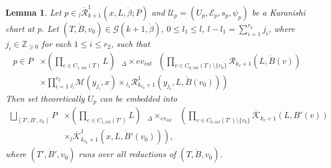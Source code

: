 \documentclass[a4paper]{article}
\newtheorem{lemma}[theorem]{Lemma}
\numberwithin{equation}{section}
\begin{document}
\begin{lemma}\label{lemma:chart}
Let $p\in{}_l\overline{\mathcal{R}}_{k+1}^1(x,L,\ring{\beta};P)$ and $\mathcal{U}_p=(U_p,\mathcal{E}_p,s_p,\psi_p)$ be a Kuranishi chart at $p$. Let $(T,\ring{B},v_0)\in\mathcal{G}(k+1,\ring{\beta})$, $0\leq l_1\leq l$, $l-l_1=\sum_{i=1}^{r_2}j_i$, where $j_i\in\mathbb{Z}_{\geq0}$ for each $1\leq i\leq r_2$, such that
\begin{equation}\label{eq:stratum}
\begin{split}
p\in P&\times\left(\prod_{e\in C_{1,\mathit{int}}(T)}L\right)\textrm{ }{{}_\Delta\times\mathit{ev}_\mathit{int}}\textrm{ }\left(\prod_{v\in C_{0,\mathit{int}}(T)\setminus\{v_0\}}\mathcal{R}_{k_v+1}\left(L,\ring{B}(v)\right)\right. \\
&\left.\times\prod_{i=1}^{r_2}{}_{j_i}\mathcal{M}(y_{j_i},x)\times{}_{l_1}\mathcal{R}_{k_{v_0}+1}^1\left(y_{j_i},L,\ring{B}(v_0)\right)\right)
\end{split}
\end{equation}
Then set theoretically $U_p$ can be embedded into
\begin{equation}
\begin{split}
\bigsqcup_{(T',B',v_0)}P&\times\left(\prod_{e\in C_{1,\mathit{int}}(T')}L\right)\textrm{ }{{}_\Delta\times_{\mathit{ev}_\mathit{int}}}\textrm{ }\left(\prod_{v\in C_{0,\mathit{int}}(T')\setminus\{v_0\}}\overline{\mathcal{K}}_{k_v+1}\left(L,B'(v)\right)\right. \\
&\left.\times{}_l\overline{\mathcal{K}}^1_{k_{v_0}+1}\left(x,L,\ring{B}'(v_0)\right)\right),
\end{split}
\end{equation}
where $(T',\ring{B}',v_0)$ runs over all reductions of $(T,\ring{B},v_0)$.
\end{lemma}
\end{document}

